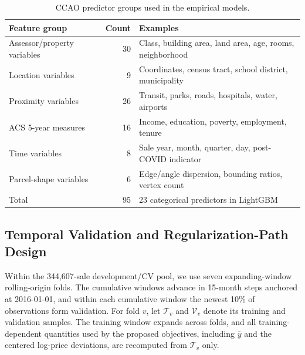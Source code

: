 \documentclass[10pt]{article}
\theoremstyle{definition}
\newcommand{\1}{\mathbf{1}}
\begin{document}
{
\begin{table}[!ht]
\centering
\caption{CCAO predictor groups used in the empirical models.}
\label{tab:feature_groups}
\begin{tabular}{lrl}
\toprule
Feature group & Count & Examples \\
\midrule
Assessor/property variables & 30 & Class, building area, land area, age, rooms, neighborhood \\
Location variables & 9 & Coordinates, census tract, school district, municipality \\
Proximity variables & 26 & Transit, parks, roads, hospitals, water, airports \\
ACS 5-year measures & 16 & Income, education, poverty, employment, tenure \\
Time variables & 8 & Sale year, month, quarter, day, post-COVID indicator \\
Parcel-shape variables & 6 & Edge/angle dispersion, bounding ratios, vertex count \\
\midrule
Total & 95 & 23 categorical predictors in LightGBM \\
\bottomrule
\end{tabular}
\end{table}
}


\subsection{Temporal Validation and Regularization-Path Design}
\label{subsec:path_design}

Within the 344,607-sale development/CV pool, we use seven expanding-window
rolling-origin folds. The cumulative windows advance in 15-month steps anchored at
2016-01-01, and within each cumulative window the newest 10\% of observations form
validation. For fold $v$, let $\mathcal T_v$ and $\mathcal V_v$ denote its training
and validation samples. The training window expands across folds, and all
training-dependent quantities used by the proposed objectives, including $\bar y$
and the centered log-price deviations, are recomputed from $\mathcal T_v$ only.
\end{document}
